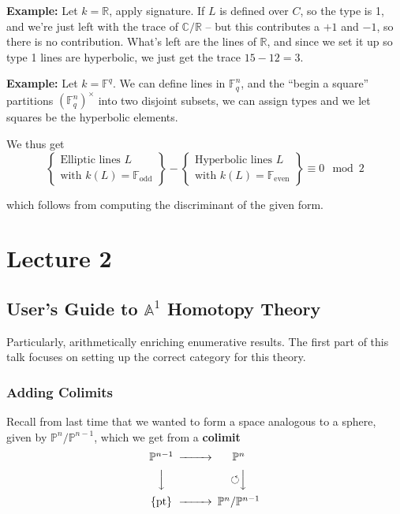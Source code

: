 \documentclass[11pt]{scrreprt}
\theoremstyle{definition}
\newcommand{\RR}[0]{{\mathbb{R}}}
\newcommand{\CC}[0]{{\mathbb{C}}}
\newcommand{\FF}[0]{{\mathbb{F}}}
\newcommand{\PP}[0]{{\mathbb{P}}}
\newcommand{\Af}[0]{{\mathbb{A}}}
\newcommand{\mltext}[1]{\left\{\begin{array}{c}#1\end{array}\right\}}
\newcommand{\pt}[0]{\{\text{pt}\}}
\newcommand{\selfmap}[0]{{\circlearrowleft}}
\begin{document}
\textbf{Example:} Let \(k=\RR\), apply signature. If \(L\) is defined
over \(C\), so the type is 1, and we're just left with the trace of
\(\CC/\RR\) -- but this contributes a \(+1\) and \(-1\), so there is no
contribution. What's left are the lines of \(\RR\), and since we set it
up so type 1 lines are hyperbolic, we just get the trace \(15-12=3\).

\textbf{Example:} Let \(k=\FF^q\). We can define lines in \(\FF_q^n\),
and the ``begin a square'' partitions \((\FF_q^n)^\times\) into two
disjoint subsets, we can assign types and we let squares be the
hyperbolic elements.

We thus get \[
\mltext{
    \text{Elliptic lines $L$ } \\
    \text{with $k(L) = \FF_\text{odd}$}
} -
\mltext{
    \text{Hyperbolic lines $L$} \\
    \text{with $k(L) = \FF_\text{even}$}
}
\equiv 0 \mod 2
\]

which follows from computing the discriminant of the given form.

\hypertarget{lecture-2}{%
\chapter{Lecture 2}\label{lecture-2}}

\hypertarget{users-guide-to-af1-homotopy-theory}{%
\section{\texorpdfstring{User's Guide to \(\Af^1\) Homotopy
Theory}{User's Guide to \textbackslash{}Af\^{}1 Homotopy Theory}}\label{users-guide-to-af1-homotopy-theory}}

Particularly, arithmetically enriching enumerative results. The first
part of this talk focuses on setting up the correct category for this
theory.

\hypertarget{adding-colimits}{%
\subsection{Adding Colimits}\label{adding-colimits}}

Recall from last time that we wanted to form a space analogous to a
sphere, given by \(\PP^n/ \PP^{n-1}\), which we get from a
\textbf{colimit} \[
\begin{CD}
  \PP^{n-1} @>>> \PP^n \\
  @VVV \selfmap @VVV \\
  \pt @>>> \PP^n/ \PP^{n-1}
\end{CD}
\]
\end{document}
